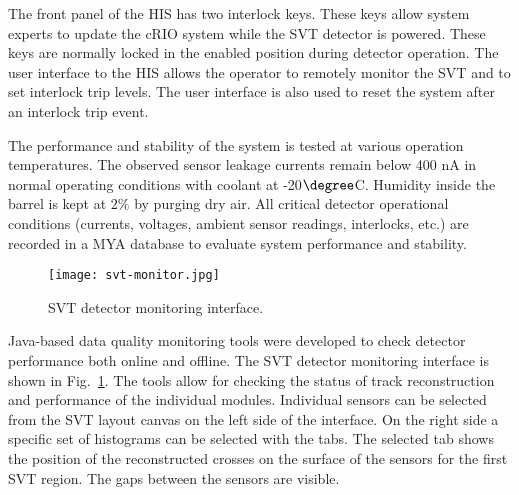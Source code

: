 The front panel of the HIS has two interlock keys. These keys allow system experts to update the cRIO system while the SVT detector is powered. These keys are normally locked in the enabled position during detector operation.
The user interface to the HIS allows the operator to remotely monitor the SVT and to set interlock trip levels. The user interface is also used to reset the system after an interlock trip event. 

The performance and stability of the system is tested at various operation temperatures. The observed sensor leakage currents remain below 400 nA in normal operating conditions with coolant at -20$\degree$C. Humidity inside the barrel is kept at $2\%$ by purging dry air. All critical detector operational conditions (currents, voltages, ambient sensor readings, interlocks, etc.) are recorded in a MYA database \cite{MYA} to evaluate system performance and stability. 

\begin{figure}[hbt] 
\centering 
\texttt{[image: svt-monitor.jpg]}
\caption{SVT detector monitoring interface.}
\label{fig:svt-monitor}
\end{figure}

Java-based data quality monitoring tools were developed to check detector performance both online and offline. The SVT detector monitoring interface is shown in Fig.~\ref{fig:svt-monitor}. The tools allow for checking the status of track reconstruction and performance of the individual modules. Individual sensors can be selected from the SVT layout canvas on the left side of the interface. On the right side a specific set of histograms can be selected with the tabs. The selected tab shows the position of the reconstructed crosses on the surface of the sensors for the first SVT region. The gaps between the sensors are visible.

